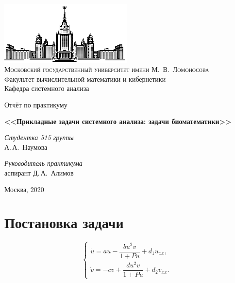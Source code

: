\documentclass[oneside, final, 12pt]{article}
\begin{document}
\thispagestyle{empty}

\begin{center}
\ \vspace{-3cm}

\includegraphics[width=0.5\textwidth]{msu.eps}\\
{\scshape Московский государственный университет имени М.~В.~Ломоносова}\\
Факультет вычислительной математики и кибернетики\\
Кафедра системного анализа

\vfill

\begin{LARGE}
	Отчёт по практикуму

\end{LARGE}

\vspace{1cm}

\begin{Huge}
\bfseries <<Прикладные задачи системного анализа: задачи биоматематики>>

\end{Huge}

\end{center}

\vspace{1cm}

\begin{flushright}
  \large
  \textit{Студентка 515 группы}\\
  А.\,А.~Наумова

  \vspace{5mm}

  \textit{Руководитель практикума}\\
   аспирант Д.\,А.~Алимов

\end{flushright}

\vfill

\begin{center}
Москва, 2020
\end{center}

\newpage
\tableofcontents								%

\newpage
\section{Постановка задачи}						%
	\[
	\begin{cases}
	\dot{u} = au - \dfrac{bu^2v}{1 + Pu} + d_1u_{xx}, \\
	\dot{v} = -cv + \dfrac{du^2v}{1 + Pu} + d_2v_{xx}.
	\end{cases}
	\]
\end{document}
